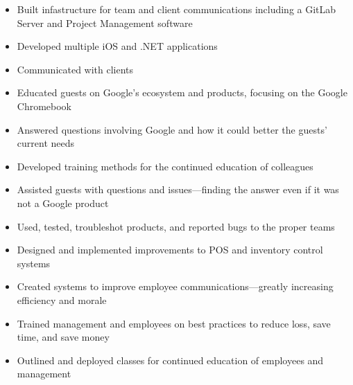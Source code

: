 \documentclass[letterpaper]{article}        %
\begin{document}

\objective{
  
  }

  
  \begin{itemize}
  
  \item Built infastructure for team and client communications including a GitLab Server and Project Management software
  
  \item Developed multiple iOS and .NET applications
  
  \item Communicated with clients
  
  \end{itemize}
  
  
  
  \begin{itemize}
  
  \item Educated guests on Google's ecosystem and products, focusing on the Google Chromebook
  
  \item Answered questions involving Google and how it could better the guests' current needs
  
  \item Developed training methods for the continued education of colleagues
  
  \item Assisted guests with questions and issues---finding the answer even if it was not a Google product
  
  \item Used, tested, troubleshot products, and reported bugs to the proper teams
  
  \end{itemize}
  
  
  
  \begin{itemize}
  
  \item Designed and implemented improvements to POS and inventory control systems
  
  \item Created systems to improve employee communications---greatly increasing efficiency and morale
  
  \item Trained management and employees on best practices to reduce loss, save time, and save money
  
  \item Outlined and deployed classes for continued education of employees and management
  
  \end{itemize}
  
\end{document}
